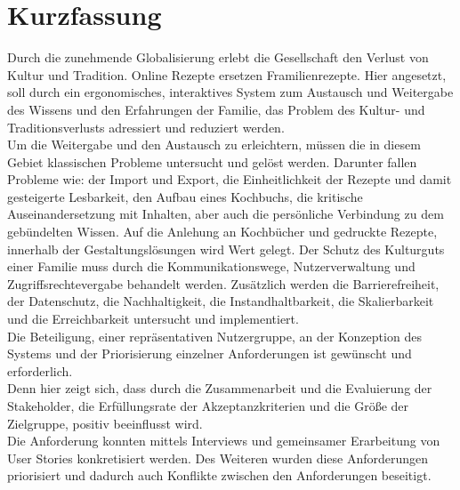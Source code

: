 \chapter*{Kurzfassung}
Durch die zunehmende Globalisierung erlebt die Gesellschaft den Verlust von Kultur und Tradition. Online Rezepte ersetzen Framilienrezepte. Hier angesetzt, soll durch ein ergonomisches, interaktives System zum Austausch und Weitergabe des Wissens und den Erfahrungen der Familie, das Problem des Kultur- und Traditionsverlusts adressiert und reduziert werden.\\
Um die Weitergabe und den Austausch zu erleichtern, müssen die in diesem Gebiet klassischen Probleme untersucht und gelöst werden. Darunter fallen Probleme wie: der Import und Export, die Einheitlichkeit der Rezepte und damit gesteigerte Lesbarkeit, den Aufbau eines Kochbuchs, die kritische Auseinandersetzung mit Inhalten, aber auch die persönliche Verbindung zu dem gebündelten Wissen. Auf die Anlehung an Kochbücher und gedruckte Rezepte, innerhalb der Gestaltungslösungen wird Wert gelegt. Der Schutz des Kulturguts einer Familie muss durch die Kommunikationswege, Nutzerverwaltung und Zugriffsrechtevergabe behandelt werden. Zusätzlich werden die Barrierefreiheit, der Datenschutz, die Nachhaltigkeit, die Instandhaltbarkeit, die Skalierbarkeit und die Erreichbarkeit untersucht und implementiert.\\
Die Beteiligung, einer repräsentativen Nutzergruppe, an der Konzeption des Systems und der Priorisierung einzelner Anforderungen ist gewünscht und erforderlich.\\
Denn hier zeigt sich, dass durch die Zusammenarbeit und die Evaluierung der Stakeholder, die Erfüllungsrate der Akzeptanzkriterien und die Größe der Zielgruppe, positiv beeinflusst wird.\\
Die Anforderung konnten mittels Interviews und gemeinsamer Erarbeitung von User Stories konkretisiert werden. Des Weiteren wurden diese Anforderungen priorisiert und dadurch auch Konflikte zwischen den Anforderungen beseitigt.
